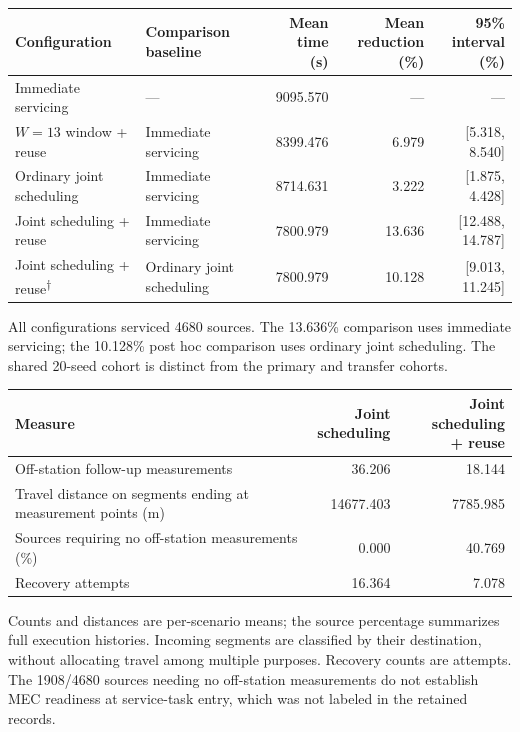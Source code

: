 \documentclass[11pt,letterpaper]{article}
\begin{document}
\begin{center}\begin{minipage}{\linewidth}\small
{}
\label{tab:s2}
\begin{tabular*}{\linewidth}{@{\extracolsep{\fill}}>{\raggedright\arraybackslash}p{.23\linewidth}>{\raggedright\arraybackslash}p{.22\linewidth}rrr@{}}
\toprule
Configuration & Comparison baseline & \shortstack[l]{Mean time\\(s)} & \shortstack[l]{Mean reduction\\(\%)} & \shortstack[l]{95\% interval\\(\%)} \\
\midrule
Immediate servicing & --- & 9095.570 & --- & --- \\
$W=13$ window + reuse & Immediate servicing & 8399.476 & 6.979 & [5.318, 8.540] \\
Ordinary joint scheduling & Immediate servicing & 8714.631 & 3.222 & [1.875, 4.428] \\
Joint scheduling + reuse & Immediate servicing & 7800.979 & 13.636 & [12.488, 14.787] \\
Joint scheduling + reuse\textsuperscript{\ensuremath{\dagger}} & Ordinary joint scheduling & 7800.979 & 10.128 & [9.013, 11.245] \\
\bottomrule
\end{tabular*}
\end{minipage}\end{center}
All configurations serviced 4680 sources. The 13.636\% comparison uses immediate servicing; the 10.128\% post hoc comparison uses ordinary joint scheduling. The shared 20-seed cohort is distinct from the primary and transfer cohorts.


\begin{center}\begin{minipage}{\linewidth}\small
{}
\label{tab:s3}
\begin{tabularx}{\linewidth}{@{}>{\raggedright\arraybackslash}Xrr@{}}
\toprule
Measure & \shortstack[l]{Joint\\scheduling} & \shortstack[l]{Joint scheduling\\+ reuse} \\
\midrule
Off-station follow-up measurements & 36.206 & 18.144 \\
Travel distance on segments ending at measurement points (m) & 14677.403 & 7785.985 \\
Sources requiring no off-station measurements (\%) & 0.000 & 40.769 \\
Recovery attempts & 16.364 & 7.078 \\
\bottomrule
\end{tabularx}
\end{minipage}\end{center}
Counts and distances are per-scenario means; the source percentage summarizes full execution histories. Incoming segments are classified by their destination, without allocating travel among multiple purposes. Recovery counts are attempts. The 1908/4680 sources needing no off-station measurements do not establish MEC readiness at service-task entry, which was not labeled in the retained records.
\end{document}
